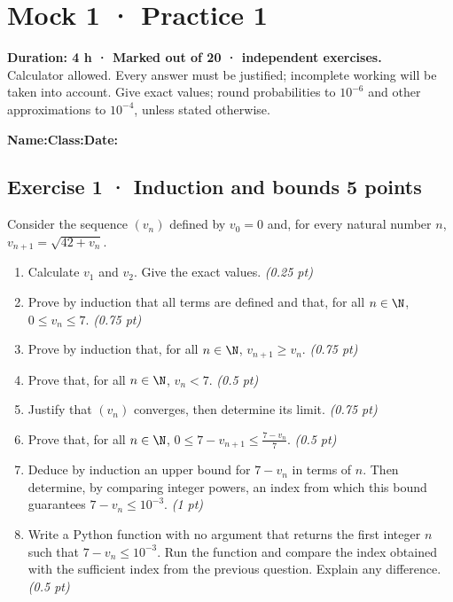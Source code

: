 \mxnewpage{}\label{sujet:5-1}

\section*{Mock 1 · Practice 1}


\textbf{Duration: 4 h · Marked out of 20 ·  independent exercises.}\\Calculator allowed. Every answer must be justified; incomplete working will be taken into account. Give exact values; round probabilities to $10^{-6}$ and other approximations to $10^{-4}$, unless stated otherwise.

\smallskip\textbf{Name:}\enspace\dotfill\quad\textbf{Class:}\enspace\dotfill\quad\textbf{Date:}\enspace\dotfill

\subsection*{Exercise 1 · Induction and bounds \hfill 5 points}Consider the sequence $(v_n)$ defined by $v_0=0$ and, for every natural number $n$, $v_{n+1}=\sqrt{42+v_n}$.

\begin{enumerate}

\item Calculate $v_1$ and $v_2$. Give the exact values. \hfill\textit{(0.25 pt)}

\item Prove by induction that all terms are defined and that, for all $n\in\N$, $0\le v_n\le7$. \hfill\textit{(0.75 pt)}

\item Prove by induction that, for all $n\in\N$, $v_{n+1}\ge v_n$. \hfill\textit{(0.75 pt)}

\item Prove that, for all $n\in\N$, $v_n<7$. \hfill\textit{(0.5 pt)}

\item Justify that $(v_n)$ converges, then determine its limit. \hfill\textit{(0.75 pt)}

\item Prove that, for all $n\in\N$, $0\le 7-v_{n+1}\le\frac{7-v_n}{7}$. \hfill\textit{(0.5 pt)}

\item Deduce by induction an upper bound for $7-v_n$ in terms of $n$. Then determine, by comparing integer powers, an index from which this bound guarantees $7-v_n\le10^{-3}$. \hfill\textit{(1 pt)}

\item Write a Python function with no argument that returns the first integer $n$ such that $7-v_n\le10^{-3}$. Run the function and compare the index obtained with the sufficient index from the previous question. Explain any difference. \hfill\textit{(0.5 pt)}

\end{enumerate}

